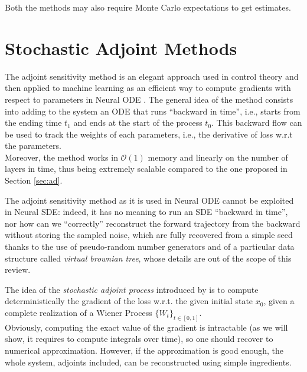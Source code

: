 \documentclass[11pt]{article}
\begin{document}
Both the methods may also require Monte Carlo expectations to get estimates.





\section{Stochastic Adjoint Methods}
\label{sec:adj}
The adjoint sensitivity method is an elegant approach used in control theory \cite{pontryagin1962mathematical} and then applied to machine learning as an efficient way to compute gradients with respect to parameters in Neural ODE \cite{chen2018neural}.
The general idea of the method consists into adding to the system an ODE that runs ``backward in time'', i.e., starts from the ending time $t_1$ and ends at the start of the process $t_0$. 
This backward flow can be used to track the weights of each parameters, i.e., the derivative of loss w.r.t the parameters. \\ 
Moreover, the method works in $\mathcal{O}(1)$ memory and linearly on the number of layers in time, thus being extremely scalable compared to the one proposed in Section \ref{sec:ad}.    

The adjoint sensitivity method as it is used in Neural ODE cannot be exploited in Neural SDE: indeed, it has no meaning to run an SDE ``backward in time'', nor how can we ``correctly'' reconstruct the forward trajectory from the backward without storing the sampled noise, which are fully recovered from a simple seed thanks to the use of pseudo-random number generators and of a particular data structure called \textit{virtual brownian tree}, whose details are out of the scope of this review. 

The idea of the \textit{stochastic adjoint process} introduced by \cite{li2020scalable} is to compute deterministically the gradient of the loss w.r.t. the given initial state $x_0$, given a complete realization of a Wiener Process $\{W_t\}_{t \in [0, 1]}$. \\ 
Obviously, computing the exact value of the gradient is intractable (as we will show, it requires to compute integrals over time), so one should recover to numerical approximation. However, if the approximation is good enough, the whole system, adjoints included, can be reconstructed using simple ingredients. \\ 
\end{document}
